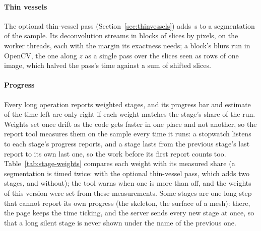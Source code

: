 \paragraph{Thin vessels} The optional thin-vessel pass (Section~\ref{sec:thinvessels}) adds
\pbValueExpRealThinSeconds\,s to a segmentation of the sample. Its deconvolution streams in blocks of
\pbValueExpThinBlockSlices{} slices by \pbValueExpThinBlockPx{} pixels, on the worker threads, each with the margin its exactness needs; a block's
blurs run in OpenCV, the one along $z$ as a single pass over the slices seen as rows of one image,
which halved the pass's time against a sum of shifted slices.

\paragraph{Progress} Every long operation reports weighted stages, and its progress bar and estimate
of the time left are only right if each weight matches the stage's share of the run. Weights set once
drift as the code gets faster in one place and not another, so the report tool measures them on the
sample every time it runs: a stopwatch listens to each stage's progress reports, and a stage lasts
from the previous stage's last report to its own last one, so the work before its first report counts
too. Table~\ref{tab:stage-weights} compares each weight with its measured share (a segmentation is timed
twice: with the optional thin-vessel pass, which adds two stages, and without); the tool warns when
one is more than \pbValueStageWeightTolerance{} off, and the weights of this version were set from these
measurements. Some stages are one long step that cannot report its own progress (the skeleton, the
surface of a mesh): there, the page keeps the time ticking, and the server sends every new stage at
once, so that a long silent stage is never shown under the name of the previous one.

\begin{table}[ht]
  \centering
  \small
  
  \caption{Progress stages of the long operations on the sample (the segmentation with and without the
    optional thin-vessel pass): configured weight (normalised
    over the stages that run) and measured share of the run's time.}
  \label{tab:stage-weights}
\end{table}

